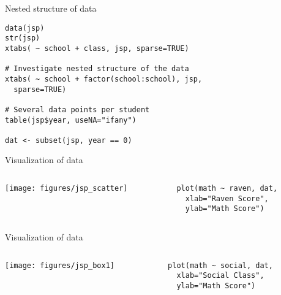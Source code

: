 \documentclass{beamer}
\begin{document}
{

\begin{frame}[fragile]{Nested structure of data}
  \begin{lstlisting}
data(jsp)
str(jsp)
xtabs( ~ school + class, jsp, sparse=TRUE)

# Investigate nested structure of the data
xtabs( ~ school + factor(school:school), jsp,
  sparse=TRUE)

# Several data points per student
table(jsp$year, useNA="ifany")

dat <- subset(jsp, year == 0)
  \end{lstlisting}
\end{frame}

}

\begin{frame}[fragile]{Visualization of data}
  \begin{columns}
    \begin{column}{6cm}
      \texttt{[image: figures/jsp\_scatter]}
    \end{column}
    \begin{column}{4cm}
      \begin{lstlisting}[style=plain]
plot(math ~ raven, dat,
  xlab="Raven Score", 
  ylab="Math Score")
      \end{lstlisting}
    \end{column}
  \end{columns}
\end{frame}

\begin{frame}[fragile]{Visualization of data}
  \begin{columns}
    \begin{column}{6cm}
      \texttt{[image: figures/jsp\_box1]}
    \end{column}
    \begin{column}{4cm}
      \begin{lstlisting}[style=plain]
plot(math ~ social, dat,
  xlab="Social Class",
  ylab="Math Score")
      \end{lstlisting}
    \end{column}
  \end{columns}
\end{frame}
\end{document}
